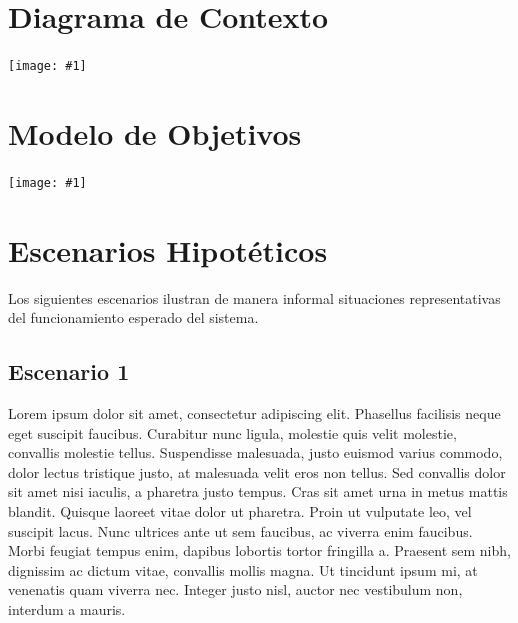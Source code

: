 \documentclass[a4paper, 10pt, twoside]{article}
\newcommand{\diagrama}[1]{
  \texttt{[image: \#1]}
}
\begin{document}
\section{Diagrama de Contexto}

\diagrama{diagrama-de-contexto.png}




\section{Modelo de Objetivos}

\diagrama{modelo-de-objetivos.jpg}




\section{Escenarios Hipotéticos}


Los siguientes escenarios ilustran de manera informal situaciones representativas del funcionamiento esperado del sistema.


\subsection{Escenario 1}

Lorem ipsum dolor sit amet, consectetur adipiscing elit. Phasellus facilisis neque eget suscipit faucibus. Curabitur nunc ligula, molestie quis velit molestie, convallis molestie tellus. Suspendisse malesuada, justo euismod varius commodo, dolor lectus tristique justo, at malesuada velit eros non tellus. Sed convallis dolor sit amet nisi iaculis, a pharetra justo tempus. Cras sit amet urna in metus mattis blandit. Quisque laoreet vitae dolor ut pharetra. Proin ut vulputate leo, vel suscipit lacus. Nunc ultrices ante ut sem faucibus, ac viverra enim faucibus. Morbi feugiat tempus enim, dapibus lobortis tortor fringilla a. Praesent sem nibh, dignissim ac dictum vitae, convallis mollis magna. Ut tincidunt ipsum mi, at venenatis quam viverra nec. Integer justo nisl, auctor nec vestibulum non, interdum a mauris.
\end{document}
